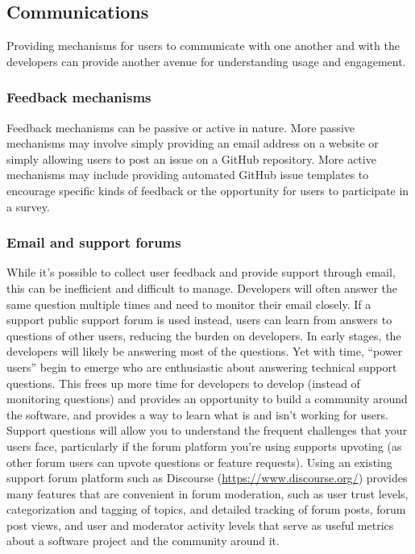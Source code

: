 \documentclass{article}
\begin{document}
\subsection{Communications} 
Providing mechanisms for users to communicate with one another and with the developers can provide another avenue for understanding usage and engagement.

\subsubsection{Feedback mechanisms}
Feedback mechanisms can be passive or active in nature. More passive mechanisms may involve simply providing an email address on a website or simply allowing users to post an issue on a GitHub repository. More active mechanisms may include providing automated GitHub issue templates to encourage specific kinds of feedback or the opportunity for users to participate in a survey.


\subsubsection{Email and support forums}
While it’s possible to collect user feedback and provide support through email, this can be inefficient and difficult to manage. Developers will often answer the same question multiple times and need to monitor their email closely. If a support public support forum is used instead, users can learn from answers to questions of other users, reducing the burden on developers. In early stages, the developers will likely be answering most of the questions. Yet with time, “power users” begin to emerge who are enthusiastic about answering technical support questions. This frees up more time for developers to develop (instead of monitoring questions) and provides an opportunity to build a community around the software, and provides a way to learn what is and isn’t working for users. Support questions will allow you to understand the frequent challenges that your users face, particularly if the forum platform you're using supports upvoting (as other forum users can upvote questions or feature requests). Using an existing support forum platform such as Discourse (\url{https://www.discourse.org/}) provides many features that are convenient in forum moderation, such as user trust levels, categorization and tagging of topics, and detailed tracking of forum posts, forum post views, and user and moderator activity levels that serve as useful metrics about a software project and the community around it.
\end{document}
